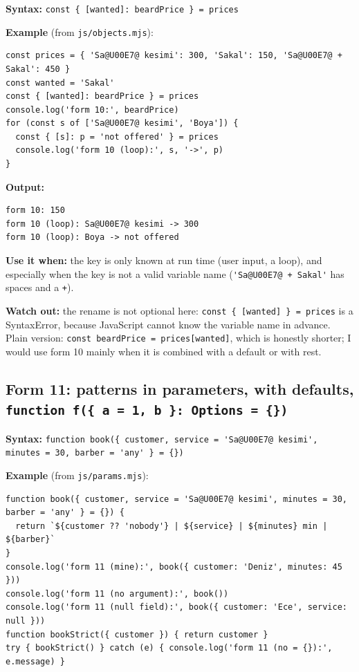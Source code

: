 \textbf{Syntax:} \passthrough{\lstinline!const \{ [wanted]: beardPrice \} = prices!}

\textbf{Example} (from \passthrough{\lstinline!js/objects.mjs!}):

\begin{lstlisting}
const prices = { 'Sa@U00E7@ kesimi': 300, 'Sakal': 150, 'Sa@U00E7@ + Sakal': 450 }
const wanted = 'Sakal'
const { [wanted]: beardPrice } = prices
console.log('form 10:', beardPrice)
for (const s of ['Sa@U00E7@ kesimi', 'Boya']) {
  const { [s]: p = 'not offered' } = prices
  console.log('form 10 (loop):', s, '->', p)
}
\end{lstlisting}

\textbf{Output:}

\begin{lstlisting}
form 10: 150
form 10 (loop): Sa@U00E7@ kesimi -> 300
form 10 (loop): Boya -> not offered
\end{lstlisting}

\textbf{Use it when:} the key is only known at run time (user input, a loop), and especially when the key
is not a valid variable name (\passthrough{\lstinline!'Sa@U00E7@ + Sakal'!} has spaces and a \passthrough{\lstinline!+!}).

\textbf{Watch out:} the rename is not optional here: \passthrough{\lstinline!const \{ [wanted] \} = prices!} is a SyntaxError, because
JavaScript cannot know the variable name in advance. Plain version: \passthrough{\lstinline!const beardPrice = prices[wanted]!},
which is honestly shorter; I would use form 10 mainly when it is combined with a default or with rest.

\subsection{\texorpdfstring{Form 11: patterns in parameters, with defaults, \texttt{function\ f(\{\ a\ =\ 1,\ b\ \}:\ Options\ =\ \{\})}}{Form 11: patterns in parameters, with defaults, function f(\{ a = 1, b \}: Options = \{\})}}\label{form-11-patterns-in-parameters-with-defaults-function-f-a-1-b-options}

\textbf{Syntax:} \passthrough{\lstinline!function book(\{ customer, service = 'Sa@U00E7@ kesimi', minutes = 30, barber = 'any' \} = \{\})!}

\textbf{Example} (from \passthrough{\lstinline!js/params.mjs!}):

\begin{lstlisting}
function book({ customer, service = 'Sa@U00E7@ kesimi', minutes = 30, barber = 'any' } = {}) {
  return `${customer ?? 'nobody'} | ${service} | ${minutes} min | ${barber}`
}
console.log('form 11 (mine):', book({ customer: 'Deniz', minutes: 45 }))
console.log('form 11 (no argument):', book())
console.log('form 11 (null field):', book({ customer: 'Ece', service: null }))
function bookStrict({ customer }) { return customer }
try { bookStrict() } catch (e) { console.log('form 11 (no = {}):', e.message) }
\end{lstlisting}

